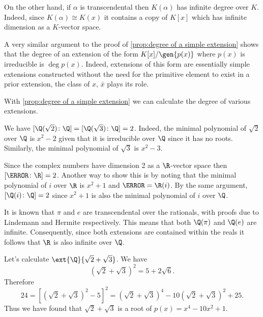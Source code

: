 \documentclass[12pt,oneside]{book}
\begin{document}
On the other hand, if \( \alpha \) is transcendental then \( K(\alpha) \) has infinite
degree over \( K \). Indeed, since \( K(\alpha) \cong K(x) \) it contains a copy of \(
K[x] \) which has infinite dimension as a \( K \)-vector space.

A very similar argument to the proof of \cref{prop:degree of a simple extension} shows
that the degree of an extension of the form \( K[x]/\gen{p(x)} \) where \( p(x) \) is
irreducible is \( \deg{p(x)} \). Indeed, extensions of this form are essentially simple
extensions constructed without the need for the primitive element to exist in a prior
extension, the class of \( x \), \( \bar{x} \) plays its role.

\begin{example}
	With \cref{prop:degree of a simple extension} we can calculate the degree of various
	extensions.
	\begin{points}
	\item We have \( [\Q(\sqrt{2}) \colon \Q] = [\Q(\sqrt{3}) \colon \Q] = 2 \). Indeed, the
		minimal polynomial of \( \sqrt{2} \) over \( \Q \) is \( x^2 - 2 \) given that it is
		irreducible over \( \Q \) since it has no roots. Similarly, the minimal polynomial of
		\( \sqrt{3} \) is \( x^2 - 3 \).
	\item Since the complex numbers have dimension 2 as a \( \R \)-vector space then \( [\C
		\colon \R ] = 2 \). Another way to show this is by noting that the minimal
		polynomial of \( i \) over \( \R \) is \( x^2 + 1 \) and \( \C = \R(i) \). By the same
		argument, \( [\Q(i) \colon \Q] = 2 \) since \( x^2 + 1 \) is also the minimal
		polynomial of \( i \) over \( \Q \).
	\item It is known that \( \pi \) and \( e \) are transcendental over the rationals, with
		proofs due to Lindemann and Hermite respectively. This means that both \(
		\Q(\pi) \) and \( \Q(e) \) are infinite. Consequently, since both extensions are
		contained within the reals it follows that \( \R \) is also infinite over \( \Q \).
	\item Let's calculate \( \ext{\Q}{\sqrt{2} + \sqrt{3}} \). We have 
		\begin{equation*}
			(\sqrt{2} + \sqrt{3})^2 = 5 + 2 \sqrt{6}.
		\end{equation*}
		Therefore 
		\begin{equation*}
			24 = [(\sqrt{2}+ \sqrt{3})^2 - 5]^2 = (\sqrt{2} + \sqrt{3})^4 - 10(\sqrt{2} +
			\sqrt{3})^2 + 25.
		\end{equation*}
		Thus we have found that \( \sqrt{2} + \sqrt{3} \) is a root of \( p(x) = x^4 - 10 x^2 +1 \).

\end{points}
\end{example}
\end{document}
